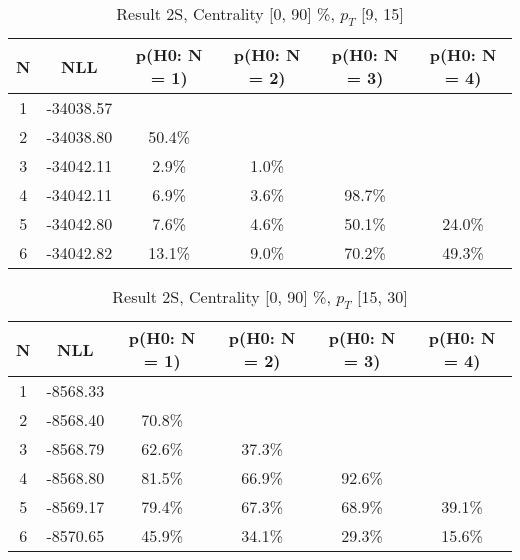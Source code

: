 \begin{table}[htb]
	\begin{center}
	\caption{Result 2S, Centrality [0, 90] \%, $p_{T}$ [9, 15] \GeV
}
{\footnotesize\renewcommand{\arraystretch}{1.4}
		\begin{tabular}{cc||cc>{\columncolor[gray]{0.8}}cc}
			N & NLL & p(H0: N = 1) & p(H0: N = 2) & p(H0: N = 3) & p(H0: N = 4)\\ 
		\hline
1 & -34038.57 & & & & \\
2 & -34038.80 & 50.4\% & & & \\
3 & -34042.11 & 2.9\% & 1.0\% & & \\
4 & -34042.11 & 6.9\% & 3.6\% & 98.7\% & \\
5 & -34042.80 & 7.6\% & 4.6\% & 50.1\% & 24.0\% \\
6 & -34042.82 & 13.1\% & 9.0\% & 70.2\% & 49.3\% \\
	\end{tabular}
		\label{tab:lab}
	}
	\end{center}\end{table}

\begin{table}[htb]
	\begin{center}
	\caption{Result 2S, Centrality [0, 90] \%, $p_{T}$ [15, 30] \GeV
}
{\footnotesize\renewcommand{\arraystretch}{1.4}
		\begin{tabular}{cc||>{\columncolor[gray]{0.8}}cccc}
			N & NLL & p(H0: N = 1) & p(H0: N = 2) & p(H0: N = 3) & p(H0: N = 4)\\ 
		\hline
1 & -8568.33 & & & & \\
2 & -8568.40 & 70.8\% & & & \\
3 & -8568.79 & 62.6\% & 37.3\% & & \\
4 & -8568.80 & 81.5\% & 66.9\% & 92.6\% & \\
5 & -8569.17 & 79.4\% & 67.3\% & 68.9\% & 39.1\% \\
6 & -8570.65 & 45.9\% & 34.1\% & 29.3\% & 15.6\% \\
	\end{tabular}
		\label{tab:lab}
	}
	\end{center}\end{table}

